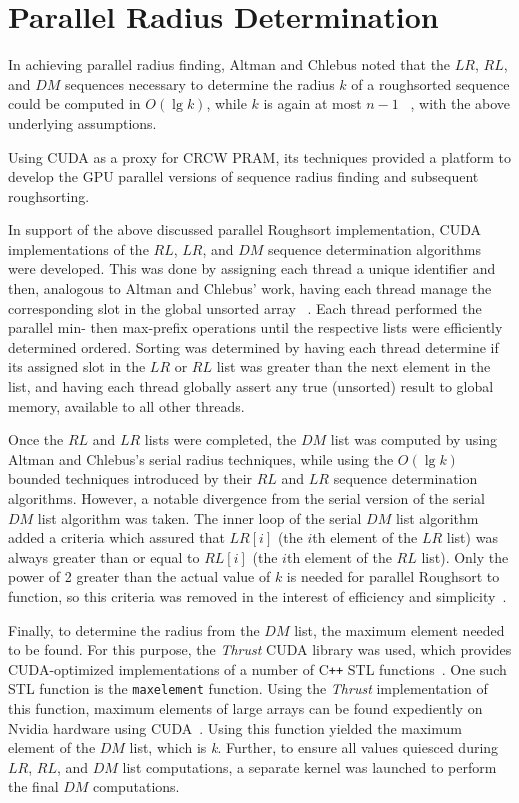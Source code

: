 \documentclass[letterpaper, 12pt]{article}
\let\supercite\cite
\renewcommand{\cite}[1]{\textnormal{~\supercite{#1}}}
\begin{document}
\section{Parallel Radius Determination}

  In achieving parallel radius finding, Altman and Chlebus noted that the $LR$, $RL$, and $DM$ sequences necessary to determine the 
  radius $k$ of a roughsorted sequence could be computed in $O(\lg k)$, while $k$ is again at most $n - 1$ \cite{altman90}, with the 
  above underlying assumptions.

  Using CUDA as a proxy for CRCW PRAM, its techniques provided a platform to develop the GPU parallel versions of sequence radius finding
  and subsequent roughsorting.  
  
  In support of the above discussed parallel Roughsort implementation, CUDA implementations of the $RL$, $LR$, and $DM$ sequence determination
  algorithms were developed.  This was done by assigning each thread a unique identifier and then, analogous to Altman and Chlebus\textquoteright
  work, having each thread manage the corresponding slot in the global unsorted array \cite{altman89}.  Each thread performed the parallel min- 
  then max-prefix operations until the respective lists were efficiently determined ordered.  Sorting was determined by having each thread 
  determine if its assigned slot in the $LR$ or $RL$ list was greater than the next element in the list, and having each thread globally assert
  any true (unsorted) result to global memory, available to all other threads.

  Once the $RL$ and $LR$ lists were completed, the $DM$ list was computed by using Altman and Chlebus\textquoteright s serial radius techniques,
  while using the $O(\lg k)$ bounded techniques introduced by their $RL$ and $LR$ sequence determination algorithms.  However, a notable divergence
  from the serial version of the serial $DM$ list algorithm was taken.  The inner loop of the serial $DM$ list algorithm added a criteria which 
  assured that $LR[i]$ (the $i$th element of the $LR$ list) was always greater than or equal to $RL[i]$ (the $i$th element of the $RL$ list).  
  Only the power of 2 greater than the actual value of $k$ is needed for parallel Roughsort to function, so this criteria was removed in the 
  interest of efficiency and simplicity\cite{altman89}.

  Finally, to determine the radius from the $DM$ list, the maximum element needed to be found.  For this purpose, the \textit{Thrust} CUDA library
  was used, which provides CUDA-optimized implementations of a number of C\texttt{++} STL functions\cite{thrust}.  One such STL function is the 
  \texttt{max\textunderscore element} function.  Using the \textit{Thrust} implementation of this function, maximum elements of large arrays can 
  be found expediently on Nvidia hardware using CUDA\cite{extrema}.  Using this function yielded the maximum element of the $DM$ list, which is 
  \textit{k}.  Further, to ensure all values quiesced during $LR$, $RL$, and $DM$ list computations, a separate kernel was launched to perform 
  the final $DM$ computations.
\end{document}
